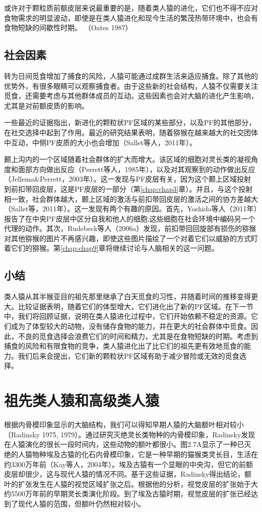 或许对于颗粒质前额皮层来说最重要的是，随着类人猿的进化，它们也不得不应对食物需求的明显波动，即使是在类人猿进化和现今生活的繁茂热带环境中，也会有食物短缺的间歇性时期。 （Oates 1987）

\subsection{社会因素}
转为日间觅食增加了捕食的风险，人猿可能通过成群生活来适应捕食。除了其他的优势外，有很多眼睛可以观察捕食者。由于这些新的社会结构，人猿不仅需要关注觅食，还需要考虑与其他群体成员的互动。这些因素也会对大脑的进化产生影响，尤其是对前额皮质的影响。

一些最近的证据指出，新进化的颗粒状PF区域的某些部分，以及PF的其他部分，在社交选择中起到了作用。最近的研究结果表明，随着猕猴在越来越大的社交团体中互动，中侧PF皮质的大小也会增加（Sallet等人，2011年）。

颞上沟内的一个区域随着社会群体的扩大而增大。该区域的细胞对灵长类的凝视角度和面部方向做出反应（Perrett等人，1985年），以及对其观察到的动作做出反应（Jellema\&Perrett，2003年）。这一发现与PF皮层有关，因为这个颞上区域投射到前扣带回皮层，这是PF皮层的一部分（第\ref{chap:chap3}章）。并且，与这个投射相一致，社会群体越大，颞上区域的激活与前扣带回皮层的激活之间的协方差越大（Sallet等，2011年）。这一发现有两个有趣的原因。首先，Yoshida等人（2011年）报告了在中央PF皮层中区分自我和他人的细胞;这些细胞在社会环境中编码另一个代理的动作。其次，Rudebeck等人（2006a）发现，前扣带回回旋部有损伤的猕猴对其他猕猴的图片不再感兴趣，即使这些图片描绘了一个对着它们以威胁的方式盯着它们的猕猴。第\ref{chap:chap9}章将继续讨论与人脑相关的这一问题。

\subsection{小结}
类人猿从其半猴亚目的祖先那里继承了白天觅食的习性，并随着时间的推移变得更大。比较证据表明，随着它们的体型增大，它们进化出了新的PF区域。在下一节中，我们将回顾证据，说明在类人猿进化过程中，它们开始依赖不稳定的资源。它们成为了体型较大的动物，没有储存食物的能力，并在更大的社会群体中觅食。因此，不良的觅食选择会浪费它们的时间和精力，尤其是在食物短缺的时期。考虑到捕食的风险和有限食物的竞争，类人猿进化出了比它们的祖先更有效地觅食的能力。我们后来会提出，它们新的颗粒状PF区域有助于减少冒险或无效的觅食选择。

\section{祖先类人猿和高级类人猿}
根据内骨模印象显示的大脑结构，我们可以得知早期人猿的大脑额叶相对较小（Radinsky 1975, 1979）。通过研究灭绝灵长类物种的内骨模印象，Radinsky发现在人猿演化的很长一段时间内，这些动物的额叶都很小。图2.7A显示了一种已灭绝的人猿物种埃及古猿的化石内骨模印象，它是一种早期的猫猴类灵长目，生活在约3300万年前（Kay等人，2004年）。埃及古猿有一个显眼的中央沟，但它的前额皮层却很少，这与现代人猿的情况不同。基于这些证据，Radinsky得出结论，额叶的扩张发生在人猿的视觉区域扩张之后。根据他的分析，视觉皮层的扩张始于大约5500万年前的早期灵长类演化阶段。到了埃及古猿时期，视觉皮层的扩张已经达到了现代人猿的范围，但额叶仍然相对较小。

